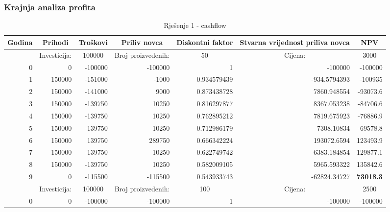 \documentclass[12pt]{article}
\begin{document}
\subsubsection{Krajnja analiza profita}
\begin{landscape}
\begin{table}[htbp]
  \centering
  \caption{Rješenje 1 - cashflow}
    \begin{tabular}{rrrrrrr}
    \toprule
    \multicolumn{1}{c}{Godina} & \multicolumn{1}{c}{Prihodi} & \multicolumn{1}{c}{Troškovi} & \multicolumn{1}{c}{Priliv novca} & \multicolumn{1}{c}{Diskontni faktor} & \multicolumn{1}{p{9.355em}}{Stvarna vrijednost \newline{}priliva novca} & \multicolumn{1}{c}{NPV} \\
    \midrule
          & \multicolumn{1}{c}{Investicija:} & \multicolumn{1}{c}{100000} & \multicolumn{1}{c}{Broj proizvedenih:} & \multicolumn{1}{c}{50} & \multicolumn{1}{c}{Cijena:} & \multicolumn{1}{c}{3000} \\
    \midrule
    0     & 0     & -100000 & -100000 & 1     & -100000 & -100000 \\
    1     & 150000 & -151000 & -1000 & 0.934579439 & -934.5794393 & -100935 \\
    2     & 150000 & -141000 & 9000  & 0.873438728 & 7860.948554 & -93073.6 \\
    3     & 150000 & -139750 & 10250 & 0.816297877 & 8367.053238 & -84706.6 \\
    4     & 150000 & -139750 & 10250 & 0.762895212 & 7819.675923 & -76886.9 \\
    5     & 150000 & -139750 & 10250 & 0.712986179 & 7308.10834 & -69578.8 \\
    6     & 150000 & 139750 & 289750 & 0.666342224 & 193072.6594 & 123493.9 \\
    7     & 150000 & -139750 & 10250 & 0.622749742 & 6383.184854 & 129877.1 \\
    8     & 150000 & -139750 & 10250 & 0.582009105 & 5965.593322 & 135842.6 \\
    9     & 0     & -115500 & -115500 & 0.543933743 & -62824.34727 & \textbf{73018.3} \\
    \midrule
          & \multicolumn{1}{c}{Investicija:} & \multicolumn{1}{c}{100000} & \multicolumn{1}{c}{Broj proizvedenih:} & \multicolumn{1}{c}{100} & \multicolumn{1}{c}{Cijena:} & \multicolumn{1}{c}{2500} \\
    \midrule
    0     & 0     & -100000 & -100000 & 1     & -100000 & -100000 \\

\end{tabular}
\end{table}
\end{landscape}
\end{document}
